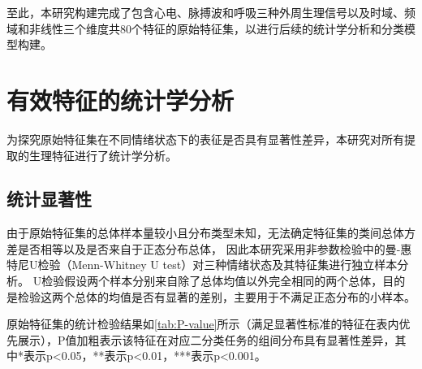 至此，本研究构建完成了包含心电、脉搏波和呼吸三种外周生理信号以及时域、频域和非线性三个维度共80个特征的原始特征集，以进行后续的统计学分析和分类模型构建。

\clearpage
\section{有效特征的统计学分析}

为探究原始特征集在不同情绪状态下的表征是否具有显著性差异，本研究对所有提取的生理特征进行了统计学分析。

\subsection{统计显著性}

\begin{spacing}{1.5} 
由于原始特征集的总体样本量较小且分布类型未知，无法确定特征集的类间总体方差是否相等以及是否来自于正态分布总体，
因此本研究采用非参数检验中的曼-惠特尼U检验（Menn-Whitney U test）对三种情绪状态及其特征集进行独立样本分析。
U检验假设两个样本分别来自除了总体均值以外完全相同的两个总体，目的是检验这两个总体的均值是否有显著的差别，主要用于不满足正态分布的小样本。

原始特征集的统计检验结果如\autoref{tab:P-value}所示（满足显著性标准的特征在表内优先展示），P值加粗表示该特征在对应二分类任务的组间分布具有显著性差异，其中*表示p<0.05，**表示p<0.01，***表示p<0.001。
\end{spacing}
\vspace{-1ex}
